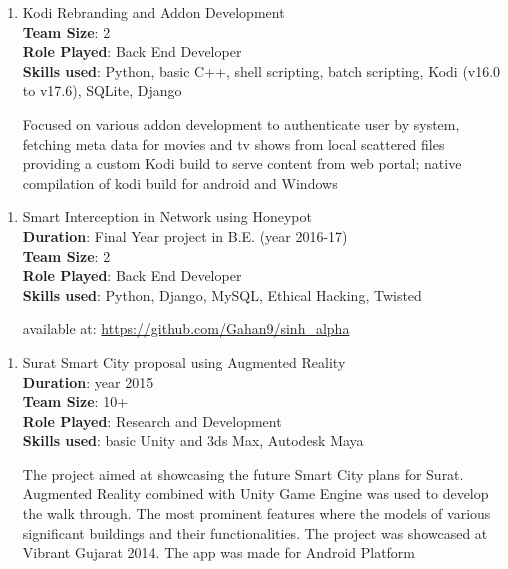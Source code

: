 \documentclass[a4paper, 14pt]{article}
\begin{document}
	\begin{enumerate}[start=1,label={\bfseries $\Rightarrow$ TITLE - }]
		\addtolength{\itemindent}{40pt}
		\item Kodi Rebranding and Addon Development
		\\ \textbf{Team Size}: 2
		\\ \textbf{Role Played}: Back End Developer
		\\ \textbf{Skills used}: Python, basic C++, shell scripting, batch scripting, Kodi (v16.0 to v17.6), SQLite, Django
		
		Focused on various addon development to authenticate user by system, fetching meta data for movies and tv shows from local scattered files providing a custom Kodi build to serve content from web portal; native compilation of kodi build for android and Windows
	\end{enumerate}
	
	\begin{enumerate}[start=1,label={\bfseries $\Rightarrow$ TITLE - }]
		\addtolength{\itemindent}{40pt}
		\item Smart Interception in Network using Honeypot
		\\ \textbf{Duration}: Final Year project in B.E. (year 2016-17)
		\\ \textbf{Team Size}: 2
		\\ \textbf{Role Played}: Back End Developer
		\\ \textbf{Skills used}: Python, Django, MySQL, Ethical Hacking, Twisted
		
		available at: \url{https://github.com/Gahan9/sinh_alpha}
	\end{enumerate}
	
	\begin{enumerate}[start=1,label={\bfseries $\Rightarrow$ TITLE - }]
		\addtolength{\itemindent}{40pt}
		\item Surat Smart City proposal using Augmented Reality
		\\ \textbf{Duration}: year 2015
		\\ \textbf{Team Size}: 10+
		\\ \textbf{Role Played}: Research and Development
		\\ \textbf{Skills used}: basic Unity and 3ds Max, Autodesk Maya
		
		The project aimed at showcasing the future Smart City plans for Surat. Augmented Reality combined with Unity Game Engine was used to develop the walk through. The most prominent features where the models of various significant buildings and their functionalities. The project was showcased at Vibrant Gujarat 2014. The app was made for Android Platform
	\end{enumerate}
	
\end{document}
